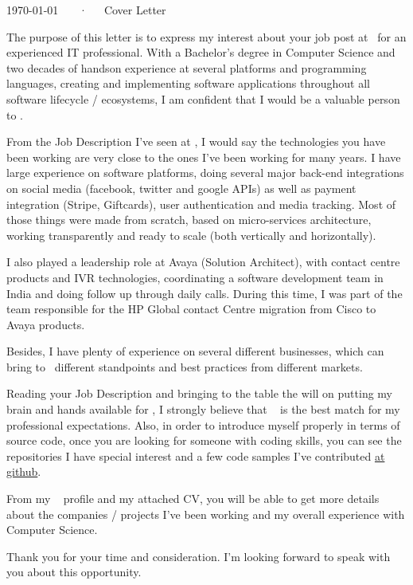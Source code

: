 \documentclass[11pt, a4paper]{awesome-cv}
\begin{document}
\makecvheader

\makecvfooter
  {\today}
  {\myname~~~·~~~Cover Letter}
  {}

\makelettertitle

\begin{cvletter}

The purpose of this letter is to express my interest about your job post at \website~for an experienced IT professional.
With a Bachelor’s degree in Computer Science and two decades of hands­on experience at several platforms
and programming languages, creating and implementing software applications throughout all software lifecycle / ecosystems,
I am confident that I would be a valuable person to \company.


From the Job Description I've seen at \website, I would say the technologies you have been working are very close to the ones I've been
working for many years. I have large experience on software platforms, doing several major back-end integrations
on social media (facebook, twitter and google APIs) as well as payment integration (Stripe, Giftcards), user authentication and media tracking.
Most of those things were made from scratch, based on micro-services architecture, working
transparently and ready to scale (both vertically and horizontally).

I also played a leadership role at Avaya (Solution Architect),
with contact centre products and IVR technologies, coordinating a software development team in India and doing follow up through daily calls.
During this time, I was part of the team responsible for the
HP Global contact Centre migration from Cisco to Avaya products.

Besides, I have plenty of experience on several different businesses, which can bring to \company~different standpoints
and best practices from different markets.


Reading your Job Description and bringing to the table the will on putting my brain and hands available for \company,
I strongly believe that \company~ is the best match for my professional expectations.
Also, in order to introduce myself properly in terms of source code, once you are looking for someone
with coding skills, you can see the repositories I have special interest and a few code samples
I've contributed \href{https://github.com/glauciom}{at github}.

From my \website~ profile and my attached CV, you will be able to get more details
about the companies / projects I've been working and my overall experience with Computer Science.

Thank you for your time and consideration. I’m looking forward to speak with you about this opportunity.

\end{cvletter}
\makeletterclosing
\end{document}
